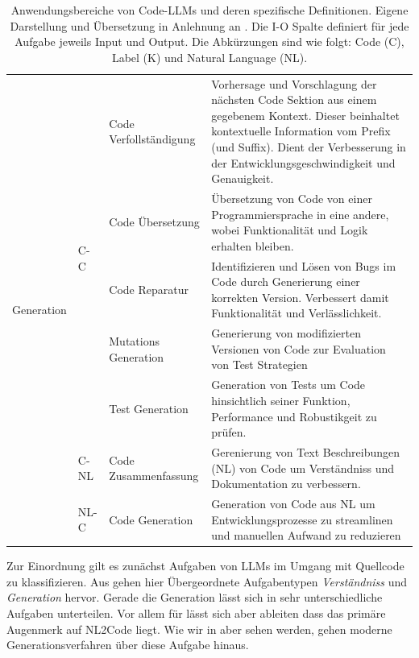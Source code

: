\begin{table}[htbp]
\begin{tabular}{@{}lllp{8cm}@{}}
        \multirow{7}{*}{Generation} 
        & \multirow{5}{*}{C-C} 
        & Code Verfollständigung & Vorhersage und Vorschlagung der nächsten Code Sektion aus einem gegebenem Kontext. Dieser beinhaltet kontextuelle Information vom Prefix (und Suffix). Dient der Verbesserung in der Entwicklungsgeschwindigkeit und Genauigkeit. \\
        & & Code Übersetzung & Übersetzung von Code von einer Programmiersprache in eine andere, wobei Funktionalität und Logik erhalten bleiben. \\
        & & Code Reparatur & Identifizieren und Lösen von Bugs im Code durch Generierung einer korrekten Version. Verbessert damit Funktionalität und Verlässlichkeit.  \\
        & & Mutations Generation & Generierung von modifizierten Versionen von Code zur Evaluation von Test Strategien \\
        & & Test Generation & Generation von Tests um Code hinsichtlich seiner Funktion, Performance und Robustikgeit zu prüfen. \\
        \cmidrule{2-4}
        & C-NL & Code Zusammenfassung & Gerenierung von Text Beschreibungen (NL) von Code um Verständniss und Dokumentation zu verbessern. \\
        \cmidrule{2-4}
        & NL-C & Code Generation & Generation von Code aus NL um Entwicklungsprozesse zu streamlinen und manuellen Aufwand zu reduzieren \\
        \bottomrule
    \end{tabular}
    
    \caption[Anwendungsbereiche von Code-LLMs]{Anwendungsbereiche von Code-LLMs und deren spezifische Definitionen. Eigene Darstellung und Übersetzung in Anlehnung an \cite{jiangSurveyLargeLanguage2026}. Die I-O Spalte definiert für jede Aufgabe jeweils Input und Output. Die Abkürzungen sind wie folgt: Code (C), Label (K) und Natural Language (NL).
    }
    \label{tab:code_llm_tasks}
\end{table}

Zur Einordnung gilt es zunächst Aufgaben von LLMs im Umgang mit Quellcode zu klassifizieren. Aus  gehen hier Übergeordnete Aufgabentypen \textit{Verständniss} und \textit{Generation} hervor. Gerade die Generation lässt sich in sehr unterschiedliche Aufgaben unterteilen. Vor allem für  lässt sich aber ableiten dass das primäre Augenmerk auf NL2Code liegt. Wie wir in  aber sehen werden, gehen moderne Generationsverfahren über diese Aufgabe hinaus. 

